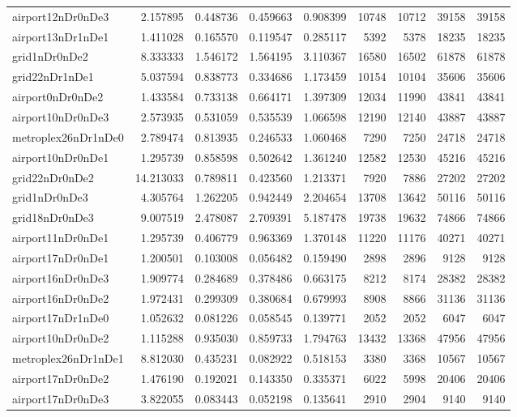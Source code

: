 \begin{longtable}{|l|r|r|r|r|r|r|r|r|}
airport12nDr0nDe3 & 2.157895 & 0.448736 & 0.459663 & 0.908399 & 10748 & 10712 & 39158 & 39158 \\
airport13nDr1nDe1 & 1.411028 & 0.165570 & 0.119547 & 0.285117 & 5392 & 5378 & 18235 & 18235 \\
grid1nDr0nDe2 & 8.333333 & 1.546172 & 1.564195 & 3.110367 & 16580 & 16502 & 61878 & 61878 \\
grid22nDr1nDe1 & 5.037594 & 0.838773 & 0.334686 & 1.173459 & 10154 & 10104 & 35606 & 35606 \\
airport0nDr0nDe2 & 1.433584 & 0.733138 & 0.664171 & 1.397309 & 12034 & 11990 & 43841 & 43841 \\
airport10nDr0nDe3 & 2.573935 & 0.531059 & 0.535539 & 1.066598 & 12190 & 12140 & 43887 & 43887 \\
metroplex26nDr1nDe0 & 2.789474 & 0.813935 & 0.246533 & 1.060468 & 7290 & 7250 & 24718 & 24718 \\
airport10nDr0nDe1 & 1.295739 & 0.858598 & 0.502642 & 1.361240 & 12582 & 12530 & 45216 & 45216 \\
grid22nDr0nDe2 & 14.213033 & 0.789811 & 0.423560 & 1.213371 & 7920 & 7886 & 27202 & 27202 \\
grid1nDr0nDe3 & 4.305764 & 1.262205 & 0.942449 & 2.204654 & 13708 & 13642 & 50116 & 50116 \\
grid18nDr0nDe3 & 9.007519 & 2.478087 & 2.709391 & 5.187478 & 19738 & 19632 & 74866 & 74866 \\
airport11nDr0nDe1 & 1.295739 & 0.406779 & 0.963369 & 1.370148 & 11220 & 11176 & 40271 & 40271 \\
airport17nDr0nDe1 & 1.200501 & 0.103008 & 0.056482 & 0.159490 & 2898 & 2896 & 9128 & 9128 \\
airport16nDr0nDe3 & 1.909774 & 0.284689 & 0.378486 & 0.663175 & 8212 & 8174 & 28382 & 28382 \\
airport16nDr0nDe2 & 1.972431 & 0.299309 & 0.380684 & 0.679993 & 8908 & 8866 & 31136 & 31136 \\
airport17nDr1nDe0 & 1.052632 & 0.081226 & 0.058545 & 0.139771 & 2052 & 2052 & 6047 & 6047 \\
airport10nDr0nDe2 & 1.115288 & 0.935030 & 0.859733 & 1.794763 & 13432 & 13368 & 47956 & 47956 \\
metroplex26nDr1nDe1 & 8.812030 & 0.435231 & 0.082922 & 0.518153 & 3380 & 3368 & 10567 & 10567 \\
airport17nDr0nDe2 & 1.476190 & 0.192021 & 0.143350 & 0.335371 & 6022 & 5998 & 20406 & 20406 \\
airport17nDr0nDe3 & 3.822055 & 0.083443 & 0.052198 & 0.135641 & 2910 & 2904 & 9140 & 9140 \\

\end{longtable}
